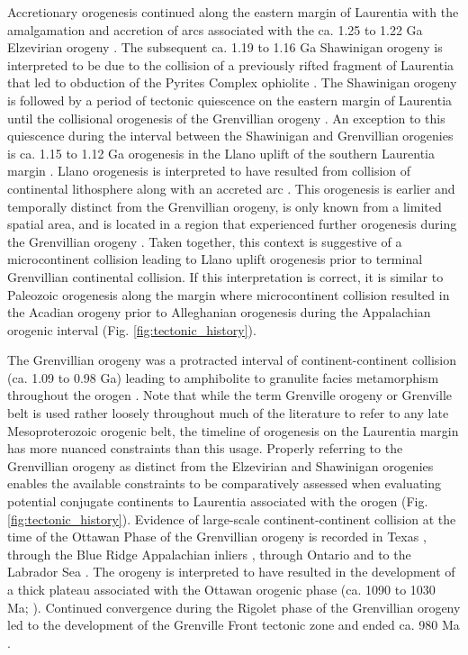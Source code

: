 \documentclass[twocolumn, switch]{article} %
\begin{document}
Accretionary orogenesis continued along the eastern margin of Laurentia with the amalgamation and accretion of arcs associated with the ca. 1.25 to 1.22 Ga Elzevirian orogeny \citep{McLelland2013a}. The subsequent ca. 1.19 to 1.16 Ga Shawinigan orogeny is interpreted to be due to the collision of a previously rifted fragment of Laurentia that led to obduction of the Pyrites Complex ophiolite \citep{McLelland2010a, Chiarenzelli2011a}. The Shawinigan orogeny is followed by a period of tectonic quiescence on the eastern margin of Laurentia until the collisional orogenesis of the Grenvillian orogeny \citep{McLelland2010a}. An exception to this quiescence during the interval between the Shawinigan and Grenvillian orogenies is ca. 1.15 to 1.12 Ga orogenesis in the Llano uplift of the southern Laurentia margin \citep{Mosher1998a}. Llano orogenesis is interpreted to have resulted from collision of continental lithosphere along with an accreted arc \citep{Mosher1998a}. This orogenesis is earlier and temporally distinct from the Grenvillian orogeny, is only known from a limited spatial area, and is located in a region that experienced further orogenesis during the Grenvillian orogeny \citep{Grimes2004a}. Taken together, this context is suggestive of a microcontinent collision leading to Llano uplift orogenesis prior to terminal Grenvillian continental collision. If this interpretation is correct, it is similar to Paleozoic orogenesis along the margin where microcontinent collision resulted in the Acadian orogeny prior to Alleghanian orogenesis during the Appalachian orogenic interval (Fig. \ref{fig:tectonic_history}).

The Grenvillian orogeny was a protracted interval of continent-continent collision (ca. 1.09 to 0.98 Ga) leading to amphibolite to granulite facies metamorphism throughout the orogen \citep{McLelland2010a}. Note that while the term Grenville orogeny or Grenville belt is used rather loosely throughout much of the literature to refer to any late Mesoproterozoic orogenic belt, the timeline of orogenesis on the Laurentia margin has more nuanced constraints than this usage. Properly referring to the Grenvillian orogeny as distinct from the Elzevirian and Shawinigan orogenies enables the available constraints to be comparatively assessed when evaluating potential conjugate continents to Laurentia associated with the orogen (Fig. \ref{fig:tectonic_history}). Evidence of large-scale continent-continent collision at the time of the Ottawan Phase of the Grenvillian orogeny is recorded in Texas \citep{Grimes2004a}, through the Blue Ridge Appalachian inliers \citep{Johnson2020a}, through Ontario and to the Labrador Sea \citep{Rivers2008a}. The orogeny is interpreted to have resulted in the development of a thick plateau associated with the Ottawan orogenic phase (ca. 1090 to 1030 Ma; \citealp{Rivers2008a}). Continued convergence during the Rigolet phase of the Grenvillian orogeny led to the development of the Grenville Front tectonic zone and ended ca. 980 Ma \citep{Hynes2010a}.
\end{document}
